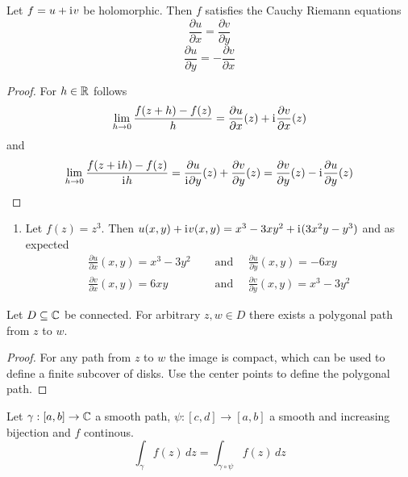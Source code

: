 \begin{theorem}\label{thm:thm_cauchy_riemann_eqations}
Let \( f = u + \mathrm{i}\mkern1mu v \) be holomorphic. Then \( f \) satisfies the Cauchy Riemann equations
\[
		\frac{\partial u}{\partial x} = \frac{\partial v}{\partial y}
\]
\[
		\frac{\partial u}{\partial y} = - \frac{\partial v}{\partial x}
\]
\end{theorem}

\begin{proof}
For \( h \in \mathbb{R} \) follows
\[
	\lim_{h \to 0}\frac{f(z + h) - f(z)}{h} = \frac{\partial u}{\partial x}(z) + \mathrm{i}\mkern1mu \frac{\partial v}{\partial x}(z)
\]	
and
\[
	\lim_{h \to 0}\frac{f(z + \mathrm{i}\mkern1mu h) - f(z)}{\mathrm{i}\mkern1mu h}
		= \frac{\partial u}{\mathrm{i}\mkern1mu\partial y}(z) + \frac{\partial v}{\partial y}(z)
		= \frac{\partial v}{\partial y}(z) - \mathrm{i}\mkern1mu\frac{\partial u}{\partial y}(z)
\]	

\end{proof}
\bigskip


\begin{examples}\hfill
    \begin{enumerate}
        \item Let \( f(z) = z^3 \). Then \( u(x,y) + \mathrm{i}\mkern1mu v(x,y) = x^3 - 3xy^2 + \mathrm{i}\mkern1mu (3x^2y -y^3) \) and as expected
			\[
				\begin{split}
					\frac{\partial u}{\partial x}(x,y) = x^3 - 3y^2 & \quad\text{ and }\quad 
						\frac{\partial u}{\partial y}(x,y) = -6xy \\
					\frac{\partial v}{\partial x}(x,y) = 6xy & \quad\text{ and }\quad
						\frac{\partial v}{\partial y}(x,y) = x^3 - 3y^2
				\end{split}
			\]
    \end{enumerate}
\end{examples}
\bigskip


\begin{lemma}
Let \( D \subseteq \mathbb{C} \) be connected. For arbitrary \( z, w \in D \) there exists a polygonal path from
\( z \) to \( w \).
\end{lemma}
\begin{proof} 
For any path from \( z \) to \( w \) the image is compact, which can be used to define a finite subcover of disks. 
Use the center points to define the polygonal path.
\end{proof}
\bigskip


\begin{lemma}
Let \( \gamma: [a,b] \to \mathbb{C} \) a smooth path, \( \psi: [c,d] \to [a,b] \) a smooth and increasing bijection 
and \( f \) continous.
	\[
		\int_{\gamma} f(z)\,dz = \int_{\gamma\circ\psi} f(z)\,dz
	\]
\end{lemma}

